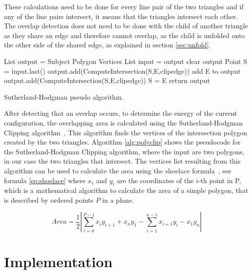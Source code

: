 \documentclass[draft,final]{vutinfth} %
\begin{document}
These calculations need to be done for every line pair of the two triangles and if any of the line pairs intersect, it means that the triangles intersect each other. The overlap detection does not need to be done with the child of another triangle as they share an edge and therefore cannot overlap, as the child is unfolded onto the other side of the shared edge, as explained in section \ref{sec:unfold}.

\begin{algorithm}
List output = Subject Polygon Vertices\;
{
List input = output\;
clear output\;
Point S = input.last()\;
{
{
{
output.add(ComputeIntersection(S,E,clipedge))\;
}
add E to output\;
}
{
{
output.add(ComputeIntersection(S,E,clipedge))\;
}
S = E\;
}
}
}
return output\;
\caption{Sutherland-Hodgman pseudo algorithm.}
\label{alg:polyclip}
\end{algorithm}

After detecting that an overlap occurs, to determine the energy of the current configuration, the overlapping area is calculated using the Sutherland-Hodgman Clipping algorithm~\cite{sutherland1974reentrant}. This algorithm finds the vertices of the intersection polygon created by the two triangles. Algorithm \ref{alg:polyclip} shows the pseudocode for the Sutherland-Hodgman Clipping algorithm, where the input are two polygons, in our case the two triangles that intersect. The vertices list resulting from this algorithm can be used to calculate the area using the shoelace formula~\cite{vslapak2017automated}, see formula \ref{eq:shoelace} where $x_i$ and $y_i$ are the coordinates of the $i$-th point in P, which is a mathematical algorithm to calculate the area of a simple polygon, that is described by ordered points $P$ in a plane.

\begin{equation}
Area = \frac{1}{2} \left| \sum_{i=0}^{P-1} x_iy_{i+1} + x_ny_1 - \sum_{i=1}^{n-1} x_{i+1}y_i - x_1y_n \right|
\label{eq:shoelace}
\end{equation}

\chapter{Implementation}
\label{chap:Implementation}
\end{document}
